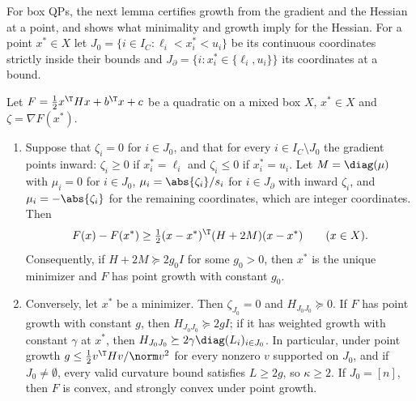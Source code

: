 
For box QPs, the next lemma certifies growth from the gradient and the
Hessian at a point, and shows what minimality and growth imply for the
Hessian. For a point $x^*\in X$ let
$J_0=\{i\in I_C:\ell_i<x^*_i<u_i\}$ be its continuous coordinates strictly
inside their bounds and $J_\partial=\{i:x^*_i\in\{\ell_i,u_i\}\}$ its
coordinates at a bound.

\begin{lemma}\label{lem:growthcert}
Let $F=\frac12x^\T Hx+b^\T x+c$ be a quadratic on a mixed box $X$, $x^*\in X$
and $\zeta=\nabla F(x^*)$.
\begin{enumerate}
\item[(a)] Suppose that $\zeta_i=0$ for $i\in J_0$, and that for every
$i\in I_C\setminus J_0$ the gradient points inward: $\zeta_i\ge0$ if
$x^*_i=\ell_i$ and $\zeta_i\le0$ if $x^*_i=u_i$. Let $M=\diag(\mu)$ with
$\mu_i=0$ for $i\in J_0$, $\mu_i=\abs{\zeta_i}/s_i$ for $i\in J_\partial$
with inward $\zeta_i$, and $\mu_i=-\abs{\zeta_i}$ for the remaining
coordinates, which are integer coordinates. Then
\begin{equation}\label{eq:minorant}
F(x)-F(x^*)\ge\tfrac12(x-x^*)^{\T}(H+2M)(x-x^*)\qquad(x\in X).
\end{equation}
Consequently, if $H+2M\succeq2g_0I$ for some $g_0>0$, then $x^*$ is the unique
minimizer and $F$ has point growth with constant $g_0$.
\item[(b)] Conversely, let $x^*$ be a minimizer. Then $\zeta_{J_0}=0$ and
$H_{J_0J_0}\succeq0$. If $F$ has point growth with constant $g$, then
$H_{J_0J_0}\succeq2gI$; if it has weighted growth with constant $\gamma$ at
$x^*$, then $H_{J_0J_0}\succeq2\gamma\diag(L_i)_{i\in J_0}$. In particular,
under point growth $g\le\frac12v^{\T}Hv/\norm v^2$ for every nonzero $v$
supported on $J_0$, and if $J_0\ne\emptyset$, every valid curvature bound
satisfies $L\ge2g$, so $\kappa\ge2$. If $J_0=[n]$, then $F$ is convex, and
strongly convex under point growth.
\end{enumerate}
\end{lemma}

